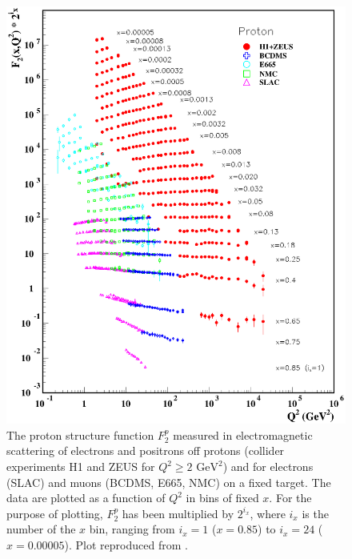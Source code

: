 \begin{figure}[p!]
  \centering
  \includegraphics[width=\textwidth,trim=0 0 10mm 25mm]{figs/f2collider-logf2}
  \caption[The $Q^2$ dependence of the proton structure function $F_2^p$.]{The proton structure function $F_2^p$ measured in electromagnetic scattering of electrons and positrons off protons (collider experiments H1 and ZEUS for $Q^2\geq 2\text{ GeV}^2$) and for electrons (SLAC) and muons (BCDMS, E665, NMC) on a fixed target. The data are plotted as a function of $Q^2$ in bins of fixed $x$. For the purpose of plotting, $F_2^p$ has been multiplied by $2^{i_x}$, where $i_x$ is the number of the $x$ bin, ranging from $i_x= 1$ ($x=0.85$) to $i_x=24$ ($x=0.00005$). Plot reproduced from \cite{Olive2014}. \label{C2S3F2}}
\end{figure}

